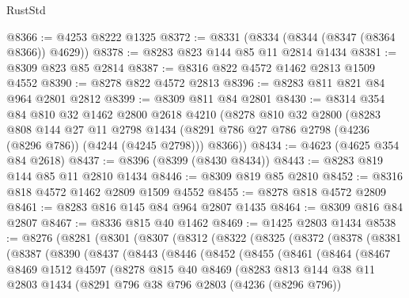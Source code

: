 \begin{lexlean}{RustStd}
\begin{coremodule}
@8366 := @4253 @8222 @1325
@8372 := @8331 (@8334 (@8344 (@8347 (@8364 @8366)) @4629))
@8378 := @8283 @823 @144 @85 @11 @2814 @1434
@8381 := @8309 @823 @85 @2814
@8387 := @8316 @822 @4572 @1462 @2813 @1509 @4552
@8390 := @8278 @822 @4572 @2813
@8396 := @8283 @811 @821 @84 @964 @2801 @2812
@8399 := @8309 @811 @84 @2801
@8430 := @8314
    @354
    @84
    @810
    @32
    @1462
    @2800
    @2618
    @4210
    (@8278
      @810
      @32
      @2800
      (@8283
        @808
        @144
        @27
        @11
        @2798
        @1434
        (@8291 @786 @27 @786 @2798 (@4236 (@8296 @786)) (@4244 (@4245 @2798)))
        @8366))
@8434 := @4623 (@4625 @354 @84 @2618)
@8437 := @8396 (@8399 (@8430 @8434))
@8443 := @8283 @819 @144 @85 @11 @2810 @1434
@8446 := @8309 @819 @85 @2810
@8452 := @8316 @818 @4572 @1462 @2809 @1509 @4552
@8455 := @8278 @818 @4572 @2809
@8461 := @8283 @816 @145 @84 @964 @2807 @1435
@8464 := @8309 @816 @84 @2807
@8467 := @8336 @815 @40 @1462
@8469 := @1425 @2803 @1434
@8538 := @8276
    (@8281
      (@8301
        (@8307
          (@8312
            (@8322
              (@8325
                (@8372
                  (@8378
                    (@8381
                      (@8387
                        (@8390
                          (@8437
                            (@8443
                              (@8446
                                (@8452
                                  (@8455
                                    (@8461
                                      (@8464
                                        (@8467
                                          @8469
                                          @1512
                                          @4597
                                          (@8278
                                            @815
                                            @40
                                            @8469
                                            (@8283
                                              @813
                                              @144
                                              @38
                                              @11
                                              @2803
                                              @1434
                                              (@8291
                                                @796
                                                @38
                                                @796
                                                @2803
                                                (@4236 (@8296 @796))

\end{coremodule}
\end{lexlean}
